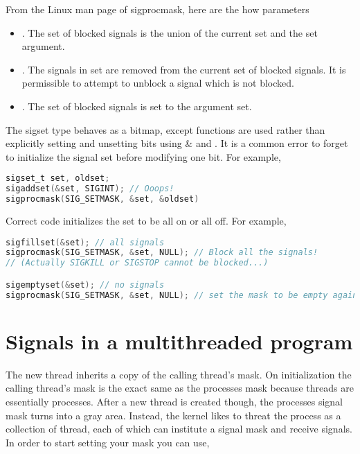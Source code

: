 From the Linux man page of sigprocmask, here are the how parameters

\begin{itemize}
\item {}. The set of blocked signals is the union of the current set and the
  set argument.
\item {}. The signals in set are removed from the current set of blocked
  signals. It is permissible to attempt to unblock a signal which is not blocked.
\item {}. The set of blocked signals is set to the argument set.
\end{itemize}

The sigset type behaves as a bitmap, except functions are used rather than explicitly setting and unsetting bits using \& and \textbar{}. It is a common error to forget to initialize the signal set before modifying one bit. For example,

\begin{lstlisting}[language=C]
sigset_t set, oldset;
sigaddset(&set, SIGINT); // Ooops!
sigprocmask(SIG_SETMASK, &set, &oldset)
\end{lstlisting}

Correct code initializes the set to be all on or all off. For example,

\begin{lstlisting}[language=C]
sigfillset(&set); // all signals
sigprocmask(SIG_SETMASK, &set, NULL); // Block all the signals!
// (Actually SIGKILL or SIGSTOP cannot be blocked...)

sigemptyset(&set); // no signals
sigprocmask(SIG_SETMASK, &set, NULL); // set the mask to be empty again
\end{lstlisting}


\section{Signals in a multithreaded program}

The new thread inherits a copy of the calling thread's mask. On initialization the calling thread's mask is the exact same as the processes mask because threads are essentially processes. After a new thread is created though, the processes signal mask turns into a gray area. Instead, the kernel likes to threat the process as a collection of thread, each of which can institute a signal mask and receive signals. In order to start setting your mask you can use,

